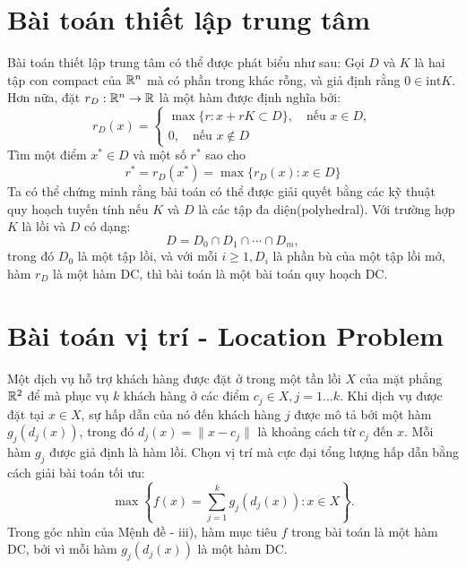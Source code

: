 \documentclass[a4paper]{report}
\begin{document}
    \section{Bài toán thiết lập trung tâm}
    Bài toán thiết lập trung tâm có thể được phát biểu như sau: Gọi $D$ và $K$ là hai tập con compact của $\mathbb{R}^n$ mà có phần trong khác rỗng, và giả định rằng $0 \in \text{int} K$. Hơn nữa, đặt $r_D : \mathbb{R}^n \rightarrow \mathbb{R}$ là một hàm được định nghĩa bởi:
    \begin{equation}
        \label{eq:positive_part_function}
        r_D(x) = \begin{cases}
            \max\{r: x + rK \subset D\}, \quad\text{nếu } x \in D,\\
            0,\quad\text{nếu } x \notin D
        \end{cases}
    \end{equation}
    Tìm một điểm $x^{*} \in D$ và một số $r^{*}$ sao cho 
    \begin{equation}
        \label{eq:design_centering_problem}
        r^{*} = r_D(x^{*}) = \max\{r_D(x): x \in D\}
    \end{equation}
    Ta có thể chứng minh rằng bài toán  có thể được giải quyết bằng các kỹ thuật quy hoạch tuyến tính nếu $K$ và $D$ là các tập đa diện(polyhedral). Với trường hợp $K$ là lồi và $D$ có dạng:
    \begin{equation}
        \label{eq:d_form_k_convex}
        D = D_0 \cap D_1 \cap \cdots \cap D_m,
    \end{equation}
    trong đó $D_0$ là một tập lồi, và với mỗi $i \geq 1, D_i$ là phần bù của một tập lồi mở, hàm $r_D$ là một hàm DC, thì bài toán  là một bài toán quy hoạch DC.

    \section{Bài toán vị trí - Location Problem}

    Một dịch vụ hỗ trợ khách hàng được đặt ở trong một tần lồi $X$ của mặt phẳng $\mathbb{R}^2$ để mà phục vụ $k$ khách hàng ở các điểm $c_j \in X, j = 1\dots k$. Khi dịch vụ được đặt tại $x \in X$, sự hấp dẫn của nó đến khách hàng $j$ được mô tả bởi một hàm $g_j(d_j(x))$, trong đó $d_j(x) = \| x - c_j \|$ là khoảng cách từ $c_j$ đến $x$. Mỗi hàm $g_j$ được giả định là hàm lồi. Chọn vị trí mà cực đại tổng lượng hấp dẫn bằng cách giải bài toán tối ưu:
    \begin{equation}
        \label{eq:location_problem}
        \max\left\{f(x) = \sum_{j=1}^kg_j(d_j(x)): x \in X\right\}.
    \end{equation}
    Trong góc nhìn của Mệnh đề  - iii), hàm mục tiêu $f$ trong bài toán  là một hàm DC, bởi vì mỗi hàm $g_j(d_j(x))$ là một hàm DC. 
\end{document}
